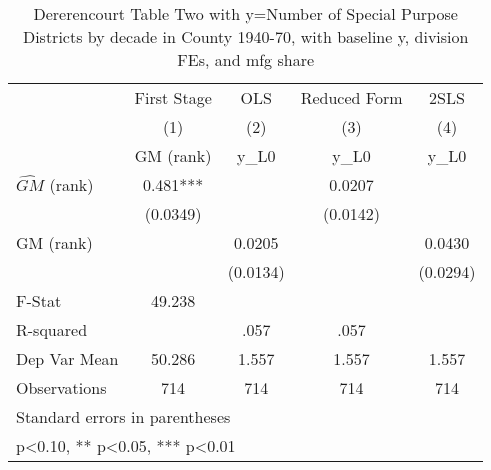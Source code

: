 \begin{table}[htbp]\centering
\def\sym#1{\ifmmode^{#1}\else\(^{#1}\)\fi}
\caption{Dererencourt Table Two with y=Number of Special Purpose Districts by decade in County 1940-70, with baseline y, division FEs, and mfg share}
\begin{tabular}{l*{4}{c}}
\toprule
                    & First Stage   &         OLS   &Reduced Form   &        2SLS   \\
                    &\multicolumn{1}{c}{(1)}&\multicolumn{1}{c}{(2)}&\multicolumn{1}{c}{(3)}&\multicolumn{1}{c}{(4)}\\
                    &\multicolumn{1}{c}{GM  (rank)}&\multicolumn{1}{c}{y\_L0}&\multicolumn{1}{c}{y\_L0}&\multicolumn{1}{c}{y\_L0}\\
\midrule
$\hat{GM}$ (rank)   &       0.481***&               &      0.0207   &               \\
                    &    (0.0349)   &               &    (0.0142)   &               \\
\addlinespace
GM  (rank)          &               &      0.0205   &               &      0.0430   \\
                    &               &    (0.0134)   &               &    (0.0294)   \\
\midrule
F-Stat              &      49.238   &               &               &               \\
R-squared           &               &        .057   &        .057   &               \\
Dep Var Mean        &      50.286   &       1.557   &       1.557   &       1.557   \\
Observations        &         714   &         714   &         714   &         714   \\
\bottomrule
\multicolumn{5}{l}{\footnotesize Standard errors in parentheses}\\
\multicolumn{5}{l}{\footnotesize * p<0.10, ** p<0.05, *** p<0.01}\\
\end{tabular}
\end{table}
